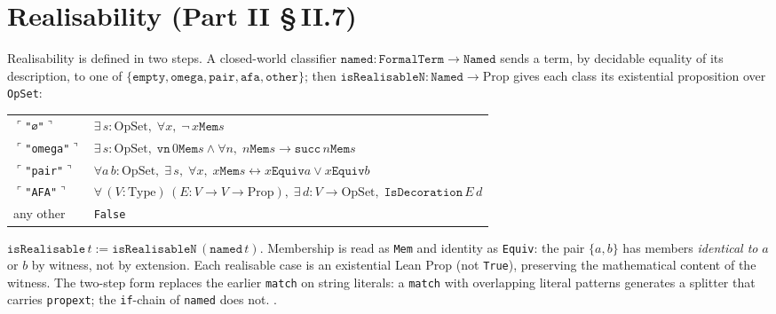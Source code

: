 \section{Realisability (Part II \S\,II.7)}
\label{sec:forms_realisable}

\begin{definition}
\label{def:isRealisable}
\leanok
{}
Realisability is defined in two steps.  A closed-world classifier
$\texttt{named} : \texttt{FormalTerm} \to \texttt{Named}$ sends a term, by
decidable equality of its description, to one of
$\{\texttt{empty}, \texttt{omega}, \texttt{pair}, \texttt{afa},
\texttt{other}\}$; then
$\texttt{isRealisableN} : \texttt{Named} \to \mathrm{Prop}$ gives each class
its existential proposition over \texttt{OpSet}:

\begin{tabular}{ll}
$\ulcorner$\texttt{"∅"}$\urcorner$ & $\exists\, s : \mathrm{OpSet},\; \forall x,\; \lnot\, x \mathrel{\mathtt{Mem}} s$ \\
$\ulcorner$\texttt{"omega"}$\urcorner$ & $\exists\, s : \mathrm{OpSet},\; \mathtt{vn}\,0 \mathrel{\mathtt{Mem}} s \land \forall n,\; n \mathrel{\mathtt{Mem}} s \to \mathtt{succ}\,n \mathrel{\mathtt{Mem}} s$ \\
$\ulcorner$\texttt{"pair"}$\urcorner$ & $\forall a\,b : \mathrm{OpSet},\; \exists\, s,\; \forall x,\; x \mathrel{\mathtt{Mem}} s \leftrightarrow x \mathrel{\mathtt{Equiv}} a \lor x \mathrel{\mathtt{Equiv}} b$ \\
$\ulcorner$\texttt{"AFA"}$\urcorner$ & $\forall\, (V : \mathrm{Type})\,(E : V\to V\to\mathrm{Prop}),\; \exists\, d : V \to \mathrm{OpSet},\; \mathtt{IsDecoration}\,E\,d$ \\
any other & \texttt{False}
\end{tabular}

$\texttt{isRealisable}\,t := \texttt{isRealisableN}\,(\texttt{named}\,t)$.
Membership is read as \texttt{Mem} and identity as \texttt{Equiv}: the pair
$\{a,b\}$ has members \emph{identical to} $a$ or $b$ by witness, not by
extension.  Each realisable case is an existential Lean Prop (not
\texttt{True}), preserving the mathematical content of the witness.  The
two-step form replaces the earlier \texttt{match} on string literals: a
\texttt{match} with overlapping literal patterns generates a splitter that
carries \texttt{propext}; the \texttt{if}-chain of \texttt{named} does not.
\axiomprofile{[]}.
\end{definition}

